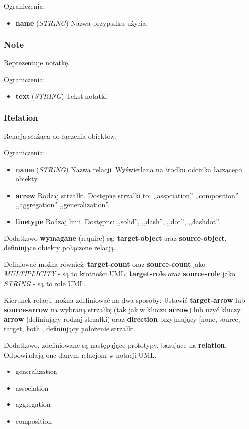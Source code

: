 Ograniczenia:
\begin{itemize}
	\item \textbf{name} (\emph{STRING}) Nazwa przypadku użycia.
\end{itemize}

\subsubsection{Note}
Reprezentuje notatkę.

Ograniczenia:
\begin{itemize}
	\item \textbf{text} (\emph{STRING}) Tekst notatki
\end{itemize}
	
\subsubsection{Relation}
Relacja służąca do łączenia obiektów.

Ograniczenia:
\begin{itemize}
	\item \textbf{name} (\emph{STRING}) Nazwa relacji. Wyświetlana na środku odcinka łączącego obiekty.
	\item \textbf{arrow} Rodzaj strzałki. Dostępne strzałki to: ,,association'' ,,composition'' ,,aggregation'' ,,generalization''.
	\item \textbf{linetype} Rodzaj linii. Dostępne: ,,solid'', ,,dash'', ,,dot'', ,,dashdot''.
\end{itemize}

Dodatkowo \textbf{wymagane} (require) są: \textbf{target-object} oraz \textbf{source-object}, definiujące obiekty połączone relacją.

Definiować można również: \textbf{target-count} oraz \textbf{source-count} jako \emph{MULTIPLICITY} - są to krotności UML; \textbf{target-role} oraz \textbf{source-role} jako \emph{STRING} - są to role UML.

Kierunek relacji można zdefiniować na dwa sposoby: Ustawić \textbf{target-arrow} lub \textbf{source-arrow} na wybraną strzałkę (tak jak w kluczu \textbf{arrow}) lub użyć kluczy \textbf{arrow} (definiujący rodzaj strzałki) oraz \textbf{direction} przyjmujący [none, source, target, both], definiujący położenie strzałki.

Dodatkowo, zdefiniowane są następujące prototypy, bazujące na \textbf{relation}. Odpowiadają one danym relacjom w notacji UML.
\begin{itemize}
	\item generalization
	\item association
	\item aggregation
	\item composition
\end{itemize}